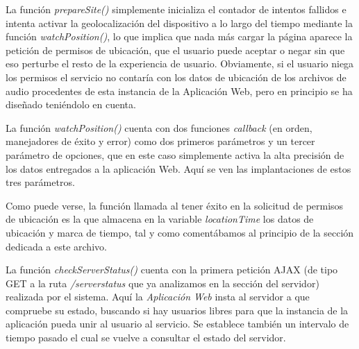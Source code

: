 La función \emph{prepareSite()} simplemente inicializa el contador de intentos fallidos e intenta activar la geolocalización del dispositivo a lo largo del tiempo mediante la función \emph{watchPosition()}, lo que implica que nada más cargar la página aparece la petición de permisos de ubicación, que el usuario puede aceptar o negar sin que eso perturbe el resto de la experiencia de usuario. Obviamente, si el usuario niega los permisos el servicio no contaría con los datos de ubicación de los archivos de audio procedentes de esta instancia de la Aplicación Web, pero en principio se ha diseñado teniéndolo en cuenta.

La función \emph{watchPosition()} cuenta con dos funciones \emph{callback} (en orden, manejadores de éxito y error) como dos primeros parámetros y un tercer parámetro de opciones, que en este caso simplemente activa la alta precisión de los datos entregados a la aplicación Web. Aquí se ven las implantaciones de estos tres parámetros.


Como puede verse, la función llamada al tener éxito en la solicitud de permisos de ubicación es la que almacena en la variable \emph{locationTime} los datos de ubicación y marca de tiempo, tal y como comentábamos al principio de la sección dedicada a este archivo.

La función \emph{checkServerStatus()} cuenta con la primera petición AJAX (de tipo GET a la ruta \emph{/serverstatus} que ya analizamos en la sección del servidor) realizada por el sistema. Aquí la \emph{Aplicación Web} insta al servidor a que compruebe su estado, buscando si hay usuarios libres para que la instancia de la aplicación pueda unir al usuario al servicio. Se establece también un intervalo de tiempo pasado el cual se vuelve a consultar el estado del servidor.

